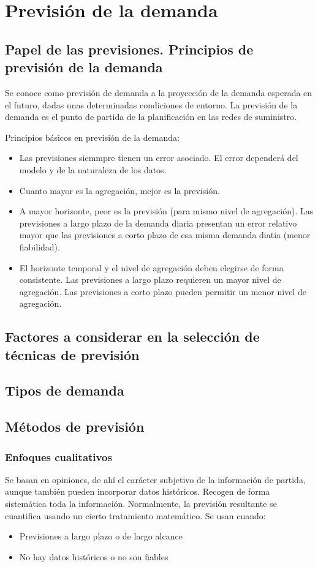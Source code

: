 \chapter{Previsión de la demanda}
\section{Papel de las previsiones. Principios de previsión de la demanda}
Se conoce como previsión de demanda a la proyección de la demanda esperada en el futuro, dadas unas determinadas condiciones de entorno. La previsión de la demanda es el punto de partida de la planificación en las redes de suministro.

Principios básicos en previsión de la demanda:
\begin{itemize}
    \item Las previsiones siemmpre tienen un error asociado. El error dependerá del modelo y de la naturaleza de los datos.
    \item Cuanto mayor es la agregación, mejor es la previsión.
    \item A mayor horizonte, peor es la previsión (para mismo nivel de agregación). Las previsiones a largo plazo de la demanda diaria presentan un error relativo mayor que las previsiones a corto plazo de esa misma demanda diatia (menor fiabilidad).
    \item El horizonte temporal y el nivel de agregación deben elegirse de forma consistente. Las previsiones a largo plazo requieren un mayor nivel de agregación. Las previsiones a corto plazo pueden permitir un menor nivel de agregación.
\end{itemize}

\section{Factores a considerar en la selección de técnicas de previsión}


\section{Tipos de demanda}

\section{Métodos de previsión}
\subsection{Enfoques cualitativos}
Se basan en opiniones, de ahí el carácter subjetivo de la información de partida, aunque también pueden incorporar datos históricos. Recogen de forma sistemática toda la información. Normalmente, la previsión resultante se cuantifica usando un cierto tratamiento matemático.
Se usan cuando:
\begin{itemize}
    \item Previsiones a largo plazo o de largo alcance
    \item No hay datos históricos o no son fiables
\end{itemize}

